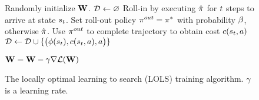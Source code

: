 \begin{figure}
 \begin{algorithmic}[1]
   \State Randomly initialize $\mathbf{W}$.
   \Repeat
    \For{$\query \in \Queries$}
     \State $\mathcal{D} \gets \varnothing$
        \State Roll-in by executing $\hat{\pi}$ for $t$ steps to 
arrive at state $s_t$.
        \State Set roll-out policy $\pi^{out} = \pi^{*}$ with probability $\beta$, otherwise $\hat{\pi}$.
       \For{$\lsAction \in \lsActionSpace$}
            \State Use $\pi^{out}$ to complete trajectory to obtain cost
            $c(s_t, a)$
            \State $\mathcal{D} \gets \mathcal{D} \cup \{ 
            \big(\phi(s_t), 
        c(s_t, a), a \big) \}$
        
       \EndFor
     \EndFor
     \State $\mathbf{W} = \mathbf{W} - \gamma \nabla\mathcal{L}(\mathbf{W})$
    \EndFor
  \EndProcedure
 \end{algorithmic}
 \caption{The locally optimal learning to search (LOLS) training algorithm.
 $\gamma$ is a learning rate.}
 \label{alg:lols}
\end{figure}
